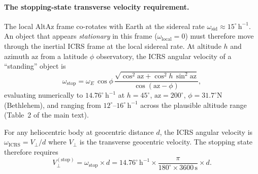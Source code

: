 \documentclass[11pt,a4paper]{article}
\begin{document}
\paragraph{The stopping-state transverse velocity requirement.}
The local AltAz frame co-rotates with Earth at the sidereal rate
$\omega_\mathrm{sid} \approx 15^\circ\,\mathrm{h}^{-1}$.
An object that appears \emph{stationary} in this frame
($\omega_\mathrm{local} = 0$) must therefore move through the inertial ICRS
frame at the local sidereal rate. At altitude $h$ and azimuth $\mathrm{az}$
from a latitude $\phi$ observatory, the ICRS angular velocity of a
``standing'' object is
\begin{equation}
  \omega_\mathrm{stop} = \omega_E\,\cos\phi\,
  \frac{\sqrt{\cos^2\!\mathrm{az} + \cos^2\! h\,\sin^2\!\mathrm{az}}}
       {\cos(\mathrm{az}-\phi)},
\end{equation}
evaluating numerically to $14.76^\circ\,\mathrm{h}^{-1}$ at
$h = 45^\circ$, $\mathrm{az} = 200^\circ$, $\phi = 31.7^\circ$N
(Bethlehem), and ranging from $12^\circ$--$16^\circ\,\mathrm{h}^{-1}$
across the plausible altitude range (Table~2 of the main text).

For any heliocentric body at geocentric distance $d$, the ICRS angular
velocity is $\omega_\mathrm{ICRS} = V_\perp/d$ where $V_\perp$ is the
transverse geocentric velocity. The stopping state therefore requires
\begin{equation}
  V_\perp^\mathrm{(stop)} = \omega_\mathrm{stop} \times d
  = 14.76^\circ\,\mathrm{h}^{-1} \times \frac{\pi}{180^\circ\times3600\,\mathrm{s}} \times d.
\end{equation}
\end{document}
